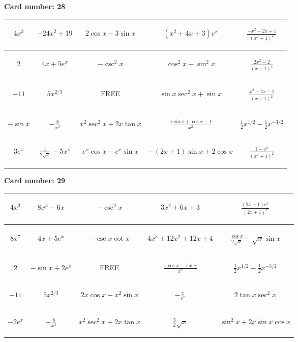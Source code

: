 \documentclass{article}
\newcommand{\entry}[1]{\begin{minipage}[t][2.75cm][t]{4cm} \vspace{1cm} \begin{center}#1\end{center} \end{minipage}}
\newcommand{\freespace}{\entry{FREE}}
\newcommand{\cardnumber}[1]{\noindent \textbf{Card number: #1} \bigskip}
\begin{document}
\pagebreak

\cardnumber{28}
\begin{center}
\begin{tabular}{|*{5}{c|}}
    \hline
    \entry{$4x^3$} & \entry{$-24x^2 + 19$} & \entry{$2 \cos x - 3 \sin x$} & \entry{$(x^2 + 4x + 3) e^x$} & \entry{$\frac{-x^2 - 2x + 1}{(x^2 + 1)^2}$} \\ \hline
    \entry{$2$} & \entry{$4x + 5e^x$} & \entry{$-\csc^2 x$} & \entry{$\cos^2 x - \sin^2 x$} & \entry{$\frac{2x^2 - 2}{(x + 1)^4}$} \\ \hline
    \entry{$-11$} & \entry{$5x^{2/3}$} & \freespace & \entry{$\sin x \sec^2 x + \sin x$} & \entry{$\frac{x^2 + 2x - 1}{(x + 1)^2}$} \\ \hline
    \entry{$-\sin x$} & \entry{$-\frac{8}{x^3}$} & \entry{$x^2 \sec^2 x + 2x \tan x$} & \entry{$\frac{x \sin x + \cos x - 1}{x^2}$} & \entry{$\frac{1}{2} x^{1/2} - \frac{1}{2} x^{-3/2}$} \\ \hline
    \entry{$3e^x$} & \entry{$\frac{1}{2\sqrt{x}} - 5x^4$} & \entry{$e^x \cos x - e^x \sin x$} & \entry{$-(2x + 1) \sin x + 2 \cos x$} & \entry{$\frac{1 - x^2}{(x^2 + 1)^2}$} \\ \hline
\end{tabular}
\end{center}

\pagebreak

\cardnumber{29}
\begin{center}
\begin{tabular}{|*{5}{c|}}
    \hline
    \entry{$4x^3$} & \entry{$8x^3 - 6x$} & \entry{$-\csc^2 x$} & \entry{$3x^2 + 6x + 3$} & \entry{$\frac{(2x - 1) e^x}{(2x + 1)^2}$} \\ \hline
    \entry{$8x^7$} & \entry{$4x + 5e^x$} & \entry{$-\csc x \cot x$} & \entry{$4x^3 + 12x^2 + 12x + 4$} & \entry{$\frac{\cos x}{2 \sqrt{x}} - \sqrt{x} \sin x$} \\ \hline
    \entry{$2$} & \entry{$-\sin x + 2e^x$} & \freespace & \entry{$\frac{x \cos x - \sin x}{x^2}$} & \entry{$\frac{1}{2} x^{1/2} - \frac{1}{2} x^{-3/2}$} \\ \hline
    \entry{$-11$} & \entry{$5x^{2/3}$} & \entry{$2x \cos x - x^2 \sin x$} & \entry{$-\frac{x}{e^x}$} & \entry{$2 \tan x \sec^2 x$} \\ \hline
    \entry{$-2e^x$} & \entry{$-\frac{8}{x^3}$} & \entry{$x^2 \sec^2 x + 2x \tan x$} & \entry{$\frac{3}{2} \sqrt{x}$} & \entry{$\sin^2 x + 2x \sin x \cos x$} \\ \hline
\end{tabular}
\end{center}
\end{document}
